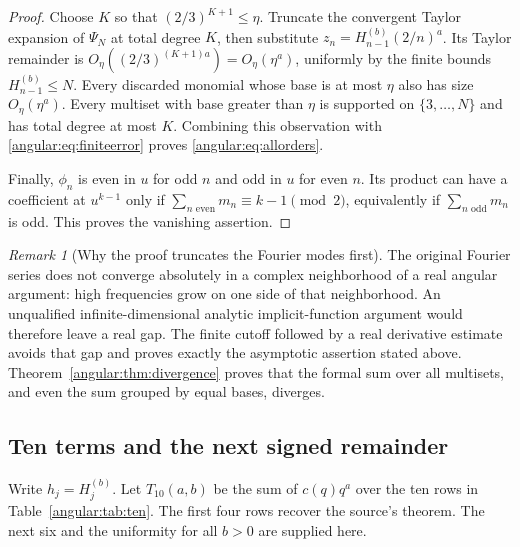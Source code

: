 \documentclass[11pt,a4paper]{article}
\theoremstyle{definition}
\theoremstyle{remark}
\newtheorem{remark}[theorem]{Remark}
\numberwithin{equation}{section}
\begin{document}
\begin{proof}
Choose $K$ so that $(2/3)^{K+1}\leq\eta$. Truncate the convergent
Taylor expansion of $\Psi_N$ at total degree $K$, then substitute
$z_n=H_{n-1}^{(b)}(2/n)^a$. Its Taylor remainder is
$O_\eta((2/3)^{(K+1)a})=O_\eta(\eta^a)$, uniformly by the finite
bounds $H_{n-1}^{(b)}\leq N$. Every discarded monomial whose
base is at most $\eta$ also has size $O_\eta(\eta^a)$.
Every multiset with base greater than $\eta$ is supported on
$\{3,\ldots,N\}$ and has total degree at most $K$. Combining
this observation with \eqref{angular:eq:finiteerror} proves
\eqref{angular:eq:allorders}.

Finally, $\phi_n$ is even in $u$ for odd $n$ and odd in $u$ for
even $n$. Its product can have a coefficient at $u^{k-1}$ only if
$\sum_{n\text{ even}}m_n\equiv k-1\pmod2$, equivalently if
$\sum_{n\text{ odd}}m_n$ is odd. This proves the vanishing assertion.
\end{proof}

\begin{remark}[Why the proof truncates the Fourier modes first]
The original Fourier series does not converge absolutely in a complex
neighborhood of a real angular argument: high frequencies grow on
one side of that neighborhood. An unqualified infinite-dimensional
analytic implicit-function argument would therefore leave a real gap.
The finite cutoff followed by a real derivative estimate avoids that
gap and proves exactly the asymptotic assertion stated above. Theorem~\ref{angular:thm:divergence} proves that the formal sum over
all multisets, and even the sum grouped by equal bases, diverges.
\end{remark}

\subsection{Ten terms and the next signed remainder}

Write $h_j=H_j^{(b)}$. Let $T_{10}(a,b)$ be the sum of $c(q)q^a$
over the ten rows in Table~\ref{angular:tab:ten}. The first four rows
recover the source's theorem. The next six and the uniformity for
all $b>0$ are supplied here.
\end{document}
